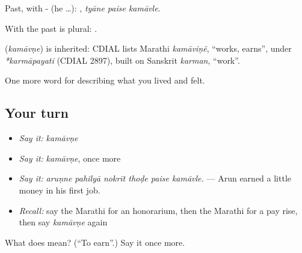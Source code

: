 Past, with - (he …):   , \emph{tyāne paise kamāvle}.

With  the past is plural:  .

\begin{cousinweb}
\textbf{} (\emph{kamāvṇe}) is inherited: CDIAL lists Marathi \emph{kamāviṇẽ}, \textquotedblleft{}works, earns\textquotedblright{}, under \emph{*karmāpayati} (CDIAL 2897), built on Sanskrit \emph{karman}, \textquotedblleft{}work\textquotedblright{}.
\end{cousinweb}

\begin{grammarlens}[title={What you've built}]
One more word for describing what you lived and felt.
\end{grammarlens}

\subsection*{Your turn}
\begin{itemize}
\raggedright
  \item \emph{Say it:} \emph{kamāvṇe}
  \item \emph{Say it:} \emph{kamāvṇe}, once more
  \item \emph{Say it:} \emph{aruṇne pahilyā nokrīt thoḍe paise kamāvle.} — Arun earned a little money in his first job.
  \item \emph{Recall:} say the Marathi for an honorarium, then the Marathi for a pay rise, then say \emph{kamāvṇe} again
\end{itemize}

\begin{tcolorbox}[breakable,colback=teal!4,colframe=teal!35!black,title={Before you move on}]
What does  mean? (\textquotedblleft{}To earn\textquotedblright{}.) Say it once more.
\end{tcolorbox}
